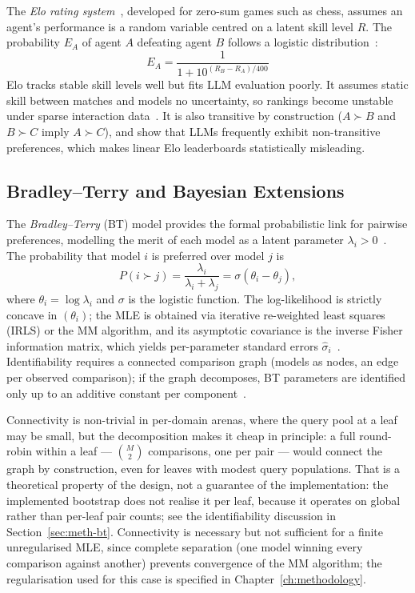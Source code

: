 The \textit{Elo rating system}~\parencite{elo1978rating}, developed
for zero-sum games such as chess, assumes an agent's performance is a
random variable centred on a latent skill level $R$. The probability
$E_A$ of agent $A$ defeating agent $B$ follows a logistic
distribution~\parencite{boubdir2024elo}:
\begin{equation}
    E_A = \frac{1}{1 + 10^{(R_B - R_A)/400}}
    \label{eq:elo-expected}
\end{equation}
Elo tracks stable skill levels well but fits LLM evaluation poorly.
It assumes static skill between matches and models no uncertainty, so
rankings become unstable under sparse interaction
data~\parencite{boubdir2024elo}. It is also transitive by
construction ($A \succ B$ and $B \succ C$ imply $A \succ C$), and
\textcite{boubdir2024elo} show that LLMs frequently exhibit
non-transitive preferences, which makes linear Elo leaderboards
statistically misleading.

\subsection*{Bradley--Terry and Bayesian Extensions}

The \textit{Bradley--Terry} (BT) model provides the formal
probabilistic link for pairwise preferences, modelling the merit of
each model as a latent parameter
$\lambda_i > 0$~\parencite{bradley1952rank}. The probability that
model $i$ is preferred over model $j$ is
\begin{equation}
    P(i \succ j) = \frac{\lambda_i}{\lambda_i + \lambda_j}
    = \sigma(\theta_i - \theta_j),
    \label{eq:bt}
\end{equation}
where $\theta_i = \log \lambda_i$ and $\sigma$ is the logistic
function. The log-likelihood is strictly concave in $(\theta_i)$; the
MLE is obtained via iterative re-weighted least squares (IRLS) or the
MM algorithm, and its asymptotic covariance is the inverse Fisher
information matrix, which yields per-parameter standard errors
$\hat{\sigma}_i$~\parencite{bradley1952rank}. Identifiability
requires a connected comparison graph (models as nodes, an edge per
observed comparison); if the graph decomposes, BT parameters are
identified only up to an additive constant per
component~\parencite{bradley1952rank}.

Connectivity is non-trivial in per-domain arenas, where the query
pool at a leaf may be small, but the decomposition makes it cheap in
principle: a full round-robin within a leaf --- $\binom{M}{2}$
comparisons, one per pair --- would connect the graph by construction,
even for leaves with modest query populations. That is a theoretical
property of the design, not a guarantee of the implementation: the
implemented bootstrap does not realise it per leaf, because it
operates on global rather than per-leaf pair counts; see the
identifiability discussion in Section~\ref{sec:meth-bt}. Connectivity is necessary but not
sufficient for a finite unregularised MLE, since complete separation
(one model winning every comparison against another) prevents
convergence of the MM algorithm; the regularisation used for this
case is specified in Chapter~\ref{ch:methodology}.

